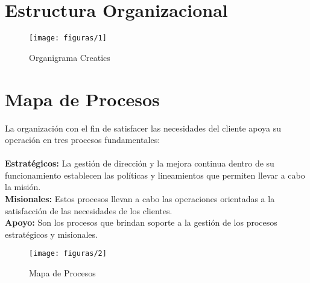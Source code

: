 \section{Estructura Organizacional}
  \begin{figure}[H]
  	\centering
  	\texttt{[image: figuras/1]}
  	\captionsetup{width=.95\textwidth}
  	\caption{Organigrama Creatics}
  	\label{figura1}
  \end{figure}
  
\section{Mapa de Procesos}
  La organización con el fin de satisfacer las necesidades del cliente apoya su operación en tres procesos fundamentales: \\ \\
  \textbf{Estratégicos:} La gestión de dirección y la mejora continua dentro de su funcionamiento establecen las políticas y lineamientos que permiten llevar a cabo la misión. \\
  \textbf{Misionales:} Estos procesos llevan a cabo las operaciones orientadas a la satisfacción de las necesidades de los clientes. \\
  \textbf{Apoyo:} Son los procesos que brindan soporte a la gestión de los procesos estratégicos y misionales.

  \begin{figure}[H]
  	\centering
  	\texttt{[image: figuras/2]}
  	\captionsetup{width=.95\textwidth}
  	\caption{Mapa de Procesos}
  	\label{figura2}
  \end{figure}